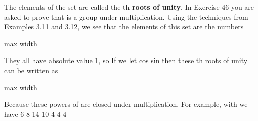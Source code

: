\documentclass[11pt,oneside]{article}
\begin{document}
\begin{BookBody}

\noindent The elements of the set  are called the th\textbf{ roots of unity}. In Exercise 46 you are asked to prove that  is a group under multiplication. Using the techniques from Examples 3.11 and 3.12, we see that the elements of this set are the numbers \BookInline{2\pi 2\pi }

\begin{center}\begin{adjustbox}{max width=\linewidth}\end{adjustbox}\end{center}

\noindent They all have absolute value 1, so  If we let \BookInline{\zeta = } cos  sin  then these th roots of unity can be written as

\begin{center}\begin{adjustbox}{max width=\linewidth}\end{adjustbox}\end{center}

\noindent Because  these  powers of \BookInline{\zeta } are closed under multiplication. For example, with  we have 6 8 14 10 4 4 4 

\end{BookBody}

\BookNarrativetrue
\end{document}
